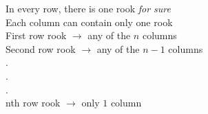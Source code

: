 \documentclass[preview]{standalone}
\begin{document}
\begin{center}
In every row, there is one rook \textit{for sure} \\ Each column can contain only one rook \\ First row rook $\rightarrow$ any of the $n$ columns \\ Second row rook $\rightarrow$ any of the $n - 1$ columns \\ . \\ .\\ .\\ nth row rook $\rightarrow$ only $1$ column
\end{center}
\end{document}
